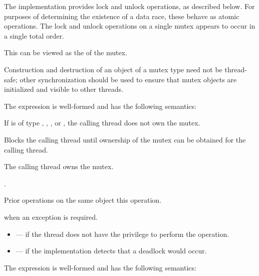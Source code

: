 \pnum
The implementation provides lock and unlock operations, as described below.
For purposes of determining the existence of a data race, these behave as
atomic operations. The lock and unlock operations on
a single mutex appears to occur in a single total order.
\begin{note}
This
can be viewed as the  of the
mutex.
\end{note}
\begin{note}
Construction and
destruction of an object of a mutex type need not be thread-safe; other
synchronization should be used to ensure that mutex objects are initialized
and visible to other threads.
\end{note}

\pnum
The expression  is well-formed and has the following semantics:

\begin{itemdescr}
\pnum
\expects
If  is of type , ,
, or , the calling
thread does not own the mutex.

\pnum
{}%
\effects
Blocks the calling thread until ownership of the mutex can be obtained for the calling thread.

\pnum
\ensures
The calling thread owns the mutex.

\pnum
\returntype {}.

\pnum
\sync
Prior  operations on the same object
 this operation.

\pnum
\throws
{} when
an exception is required.

\pnum
\errors
\begin{itemize}
\item {} --- if the thread does not have the
privilege to perform the operation.

\item {} --- if the implementation detects
that a deadlock would occur.
\end{itemize}
\end{itemdescr}

\pnum
The expression  is well-formed and has the following semantics:

